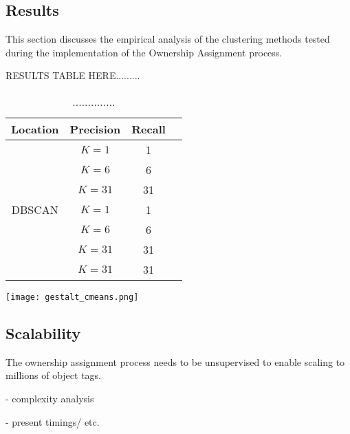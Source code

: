 \subsection{Results}
This section discusses the empirical analysis of the clustering methods tested during the implementation of the Ownership Assignment process. 

RESULTS TABLE HERE.........
\begin{table}[h!]
	\begin{center}
		\begin{tabular}{ |c|c|c|c| } 
			\hline
			Location & Precision & Recall \\
			\hline
			\multirow{7}{4em}{DBSCAN} 
                & $K=1$ & 1 \\ 
			& $K=6$ & 6  \\ 
			& $K=31$ & 31 \\ 
                & $K=1$ & 1 \\ 
			& $K=6$ & 6  \\ 
			& $K=31$ & 31 \\ 
   			& $K=31$ & 31 \\ 
			\hline
		\end{tabular}
		\label{table:clustering}
		\caption{..............}
	\end{center}
\end{table}


\begin{figure*}[ht]
\label{fig:cmeans}        
\texttt{[image: gestalt\_cmeans.png]}
\centering
\caption[width=\textwidth]{............}
\end{figure*}


\subsection{Scalability}
The ownership assignment process needs to be unsupervised to enable scaling to millions of object tags. 

- complexity analysis

- present timings/ etc.








